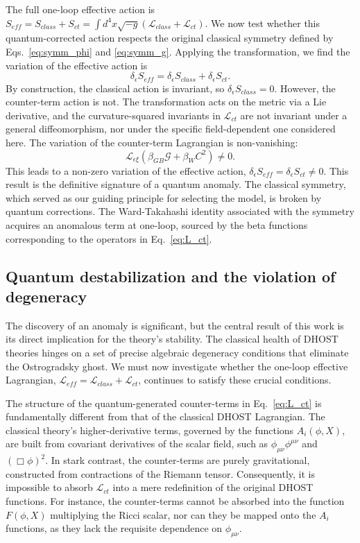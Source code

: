 \documentclass[twocolumn]{aastex631}
\begin{document}
The full one-loop effective action is $S_{eff} = S_{class} + S_{ct} = \int d^4x \sqrt{-g} (\mathcal{L}_{class} + \mathcal{L}_{ct})$. We now test whether this quantum-corrected action respects the original classical symmetry defined by Eqs.~\eqref{eq:symm_phi} and \eqref{eq:symm_g}. Applying the transformation, we find the variation of the effective action is
\begin{equation}
    \delta_\epsilon S_{eff} = \delta_\epsilon S_{class} + \delta_\epsilon S_{ct}.
\end{equation}
By construction, the classical action is invariant, so $\delta_\epsilon S_{class} = 0$. However, the counter-term action is not. The transformation acts on the metric via a Lie derivative, and the curvature-squared invariants in $\mathcal{L}_{ct}$ are not invariant under a general diffeomorphism, nor under the specific field-dependent one considered here. The variation of the counter-term Lagrangian is non-vanishing:
\begin{equation}
    \mathcal{L}_{\epsilon \xi} \left( \beta_{GB} \mathcal{G} + \beta_{W} C^2 \right) \neq 0.
\end{equation}
This leads to a non-zero variation of the effective action, $\delta_\epsilon S_{eff} = \delta_\epsilon S_{ct} \neq 0$. This result is the definitive signature of a quantum anomaly. The classical symmetry, which served as our guiding principle for selecting the model, is broken by quantum corrections. The Ward-Takahashi identity associated with the symmetry acquires an anomalous term at one-loop, sourced by the beta functions corresponding to the operators in Eq.~\eqref{eq:L_ct}.

\subsection{Quantum destabilization and the violation of degeneracy}
The discovery of an anomaly is significant, but the central result of this work is its direct implication for the theory's stability. The classical health of DHOST theories hinges on a set of precise algebraic degeneracy conditions that eliminate the Ostrogradsky ghost. We must now investigate whether the one-loop effective Lagrangian, $\mathcal{L}_{eff} = \mathcal{L}_{class} + \mathcal{L}_{ct}$, continues to satisfy these crucial conditions.

The structure of the quantum-generated counter-terms in Eq.~\eqref{eq:L_ct} is fundamentally different from that of the classical DHOST Lagrangian. The classical theory's higher-derivative terms, governed by the functions $A_i(\phi, X)$, are built from covariant derivatives of the scalar field, such as $\phi_{\mu\nu}\phi^{\mu\nu}$ and $(\Box\phi)^2$. In stark contrast, the counter-terms are purely gravitational, constructed from contractions of the Riemann tensor. Consequently, it is impossible to absorb $\mathcal{L}_{ct}$ into a mere redefinition of the original DHOST functions. For instance, the counter-terms cannot be absorbed into the function $F(\phi, X)$ multiplying the Ricci scalar, nor can they be mapped onto the $A_i$ functions, as they lack the requisite dependence on $\phi_{\mu\nu}$.
\end{document}
